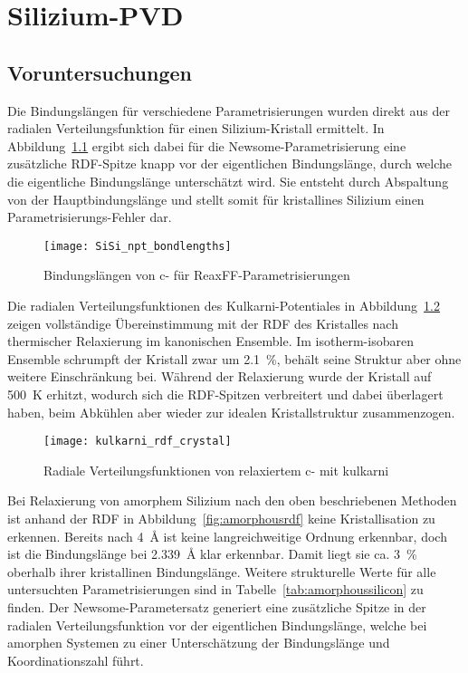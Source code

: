 \chapter{Silizium-PVD}
\label{appendix_silicon}


\section{Voruntersuchungen}

Die Bindungslängen für verschiedene Parametrisierungen wurden direkt aus der radialen Verteilungsfunktion für einen Silizium-Kristall ermittelt.
In Abbildung~\ref{fig:sisibondlengths} ergibt sich dabei für die Newsome-Parametrisierung eine zusätzliche RDF-Spitze knapp vor der eigentlichen Bindungslänge, durch welche die eigentliche Bindungslänge unterschätzt wird.
Sie entsteht durch Abspaltung von der Hauptbindungslänge und stellt somit für kristallines Silizium einen Para\-metri\-sierungs-Fehler dar.

\begin{figure}[!ht]
  \centering
  \texttt{[image: SiSi\_npt\_bondlengths]}
  \caption{Bindungslängen von c- für ReaxFF-Parametrisierungen}
  \label{fig:sisibondlengths}
\end{figure}

Die radialen Verteilungsfunktionen des Kulkarni-Potentiales in Abbildung~\ref{fig:kulkarnirdf} zeigen vollständige Übereinstimmung mit der RDF des Kristalles nach thermischer Relaxierung im kanonischen Ensemble.
Im isotherm-isobaren Ensemble schrumpft der Kristall zwar um \SI{2.1}{\percent}, behält seine Struktur aber ohne weitere Einschränkung bei.
Während der Relaxierung wurde der Kristall auf \SI{500}{\kelvin} erhitzt, wodurch sich die RDF-Spitzen verbreitert und dabei überlagert haben, beim Abkühlen aber wieder zur idealen Kristallstruktur zusammenzogen.

\begin{figure}[!ht]
  \centering
  \texttt{[image: kulkarni\_rdf\_crystal]}
  \caption[Radiale Verteilungsfunktionen von relaxiertem c-]{
    Radiale Verteilungsfunktionen von relaxiertem c- mit kulkarni
  }
  \label{fig:kulkarnirdf}
\end{figure}

Bei Relaxierung von amorphem Silizium nach den oben beschriebenen Methoden ist anhand der RDF in Abbildung~\ref{fig:amorphousrdf} keine Kristallisation zu erkennen.
Bereits nach \SI{4}{\angstrom} ist keine langreichweitige Ordnung erkennbar, doch ist die Bindungslänge bei \SI{2.339}{\angstrom} klar erkennbar.
Damit liegt sie ca. \SI{3}{\percent} oberhalb ihrer kristallinen Bindungslänge.
Weitere strukturelle Werte für alle untersuchten Parametrisierungen sind in Tabelle~\ref{tab:amorphoussilicon} zu finden.
Der Newsome-Parametersatz generiert eine zusätzliche Spitze in der radialen Verteilungsfunktion vor der eigentlichen Bindungslänge, welche bei amorphen Systemen zu einer Unterschätzung der Bindungslänge und Koordinationszahl führt.

